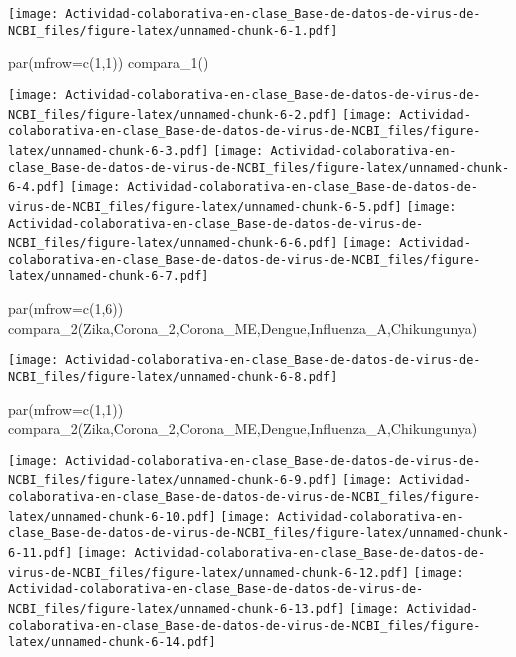 \documentclass[
]{article}
\newenvironment{Shaded}{\begin{snugshade}}{\end{snugshade}}
\newcommand{\AttributeTok}[1]{\textcolor[rgb]{0.77,0.63,0.00}{#1}}
\newcommand{\DecValTok}[1]{\textcolor[rgb]{0.00,0.00,0.81}{#1}}
\newcommand{\FunctionTok}[1]{\textcolor[rgb]{0.00,0.00,0.00}{#1}}
\newcommand{\NormalTok}[1]{#1}
\begin{document}
\texttt{[image: Actividad-colaborativa-en-clase\_Base-de-datos-de-virus-de-NCBI\_files/figure-latex/unnamed-chunk-6-1.pdf]}

\begin{Shaded}
\begin{Highlighting}[]
\FunctionTok{par}\NormalTok{(}\AttributeTok{mfrow=}\FunctionTok{c}\NormalTok{(}\DecValTok{1}\NormalTok{,}\DecValTok{1}\NormalTok{))}
\FunctionTok{compara\_1}\NormalTok{()}
\end{Highlighting}
\end{Shaded}

\texttt{[image: Actividad-colaborativa-en-clase\_Base-de-datos-de-virus-de-NCBI\_files/figure-latex/unnamed-chunk-6-2.pdf]}
\texttt{[image: Actividad-colaborativa-en-clase\_Base-de-datos-de-virus-de-NCBI\_files/figure-latex/unnamed-chunk-6-3.pdf]}
\texttt{[image: Actividad-colaborativa-en-clase\_Base-de-datos-de-virus-de-NCBI\_files/figure-latex/unnamed-chunk-6-4.pdf]}
\texttt{[image: Actividad-colaborativa-en-clase\_Base-de-datos-de-virus-de-NCBI\_files/figure-latex/unnamed-chunk-6-5.pdf]}
\texttt{[image: Actividad-colaborativa-en-clase\_Base-de-datos-de-virus-de-NCBI\_files/figure-latex/unnamed-chunk-6-6.pdf]}
\texttt{[image: Actividad-colaborativa-en-clase\_Base-de-datos-de-virus-de-NCBI\_files/figure-latex/unnamed-chunk-6-7.pdf]}

\begin{Shaded}
\begin{Highlighting}[]
\FunctionTok{par}\NormalTok{(}\AttributeTok{mfrow=}\FunctionTok{c}\NormalTok{(}\DecValTok{1}\NormalTok{,}\DecValTok{6}\NormalTok{))}
\FunctionTok{compara\_2}\NormalTok{(Zika,Corona\_2,Corona\_ME,Dengue,Influenza\_A,Chikungunya)}
\end{Highlighting}
\end{Shaded}

\texttt{[image: Actividad-colaborativa-en-clase\_Base-de-datos-de-virus-de-NCBI\_files/figure-latex/unnamed-chunk-6-8.pdf]}

\begin{Shaded}
\begin{Highlighting}[]
\FunctionTok{par}\NormalTok{(}\AttributeTok{mfrow=}\FunctionTok{c}\NormalTok{(}\DecValTok{1}\NormalTok{,}\DecValTok{1}\NormalTok{))}
\FunctionTok{compara\_2}\NormalTok{(Zika,Corona\_2,Corona\_ME,Dengue,Influenza\_A,Chikungunya)}
\end{Highlighting}
\end{Shaded}

\texttt{[image: Actividad-colaborativa-en-clase\_Base-de-datos-de-virus-de-NCBI\_files/figure-latex/unnamed-chunk-6-9.pdf]}
\texttt{[image: Actividad-colaborativa-en-clase\_Base-de-datos-de-virus-de-NCBI\_files/figure-latex/unnamed-chunk-6-10.pdf]}
\texttt{[image: Actividad-colaborativa-en-clase\_Base-de-datos-de-virus-de-NCBI\_files/figure-latex/unnamed-chunk-6-11.pdf]}
\texttt{[image: Actividad-colaborativa-en-clase\_Base-de-datos-de-virus-de-NCBI\_files/figure-latex/unnamed-chunk-6-12.pdf]}
\texttt{[image: Actividad-colaborativa-en-clase\_Base-de-datos-de-virus-de-NCBI\_files/figure-latex/unnamed-chunk-6-13.pdf]}
\texttt{[image: Actividad-colaborativa-en-clase\_Base-de-datos-de-virus-de-NCBI\_files/figure-latex/unnamed-chunk-6-14.pdf]}
\end{document}

